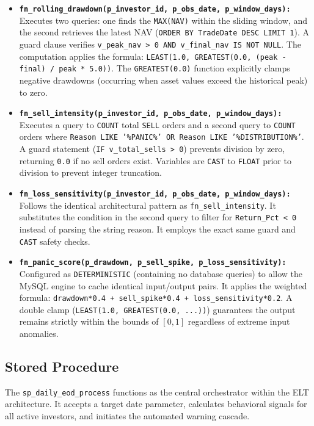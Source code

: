 \begin{itemize}
    \item \textbf{\texttt{fn\_rolling\_drawdown(p\_investor\_id, p\_obs\_date, p\_window\_days):}} 
    Executes two queries: one finds the \texttt{MAX(NAV)} within the sliding window, and the second retrieves the latest NAV (\texttt{ORDER BY TradeDate DESC LIMIT 1}). A guard clause verifies \texttt{v\_peak\_nav > 0 AND v\_final\_nav IS NOT NULL}. 
    The computation applies the formula: \texttt{LEAST(1.0, GREATEST(0.0, (peak - final) / peak * 5.0))}. The \texttt{GREATEST(0.0)} function explicitly clamps negative drawdowns (occurring when asset values exceed the historical peak) to zero.

    \item \textbf{\texttt{fn\_sell\_intensity(p\_investor\_id, p\_obs\_date, p\_window\_days):}}
    Executes a query to \texttt{COUNT} total \texttt{SELL} orders and a second query to \texttt{COUNT} orders where \texttt{Reason LIKE '\%PANIC\%' OR Reason LIKE '\%DISTRIBUTION\%'}. A guard statement (\texttt{IF v\_total\_sells > 0}) prevents division by zero, returning \texttt{0.0} if no sell orders exist. Variables are \texttt{CAST} to \texttt{FLOAT} prior to division to prevent integer truncation.

    \item \textbf{\texttt{fn\_loss\_sensitivity(p\_investor\_id, p\_obs\_date, p\_window\_days):}}
    Follows the identical architectural pattern as \texttt{fn\_sell\_intensity}. It substitutes the condition in the second query to filter for \texttt{Return\_Pct < 0} instead of parsing the string reason. It employs the exact same guard and \texttt{CAST} safety checks.

    \item \textbf{\texttt{fn\_panic\_score(p\_drawdown, p\_sell\_spike, p\_loss\_sensitivity):}}
    Configured as \texttt{DETERMINISTIC} (containing no database queries) to allow the MySQL engine to cache identical input/output pairs. It applies the weighted formula: \texttt{drawdown*0.4 + sell\_spike*0.4 + loss\_sensitivity*0.2}. A double clamp (\texttt{LEAST(1.0, GREATEST(0.0, ...))}) guarantees the output remains strictly within the bounds of $[0, 1]$ regardless of extreme input anomalies.
\end{itemize}


\subsection{Stored Procedure}
The \texttt{sp\_daily\_eod\_process} functions as the central orchestrator within the ELT architecture. It accepts a target date parameter, calculates behavioral signals for all active investors, and initiates the automated warning cascade. 

